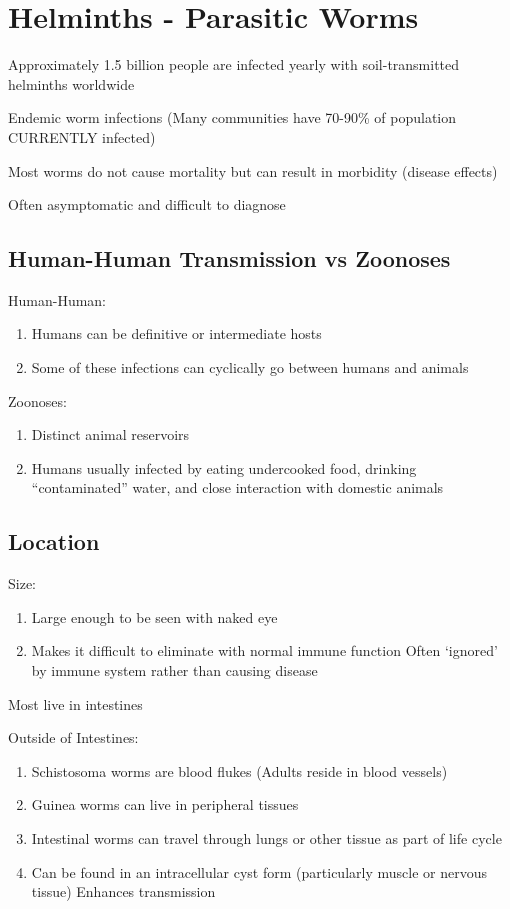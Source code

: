 \documentclass{notes}
\begin{document}
\section*{Helminths - Parasitic Worms}
Approximately 1.5 billion people are infected yearly with soil-transmitted helminths worldwide

\tab \indicates Endemic worm infections (Many communities have 70-90\% of population CURRENTLY infected)

Most worms do not cause mortality but can result in morbidity (disease effects)

\tab \indicates Often asymptomatic and difficult to diagnose

\subsection*{Human-Human Transmission vs Zoonoses}
Human-Human:
\begin{enumerate}
    \item Humans can be definitive or intermediate hosts
    \item Some of these infections can cyclically go between humans and animals
\end{enumerate}

Zoonoses:
\begin{enumerate}
    \item Distinct animal reservoirs
    \item Humans usually infected by eating undercooked food, drinking ``contaminated'' water, and close interaction with domestic animals
\end{enumerate}

\subsection*{Location}
Size:
\begin{enumerate}
    \item Large enough to be seen with naked eye
    \item Makes it difficult to eliminate with normal immune function
    \subitem Often `ignored' by immune system rather than causing disease
\end{enumerate}

Most live in intestines

Outside of Intestines:
\begin{enumerate}
    \item Schistosoma worms are blood flukes (Adults reside in blood vessels)
    \item Guinea worms can live in peripheral tissues
    \item Intestinal worms can travel through lungs or other tissue as part of life cycle
    \item Can be found in an intracellular cyst form (particularly muscle or nervous tissue)
    \subitem Enhances transmission
\end{enumerate}
\end{document}

